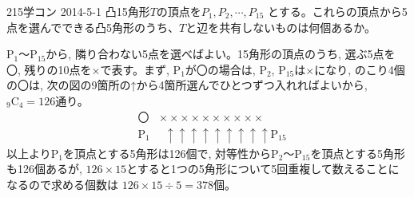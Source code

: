 \begin{thm}{215}{}{学コン 2014-5-1}
 凸15角形$T$の頂点を$P_1, P_2, \cdots, P_{15}$ とする。これらの頂点から5点を選んでできる凸5角形のうち、$T$と辺を共有しないものは何個あるか。
\end{thm}

P$_1$～P$_{15}$から, 隣り合わない5点を選べばよい。15角形の頂点のうち, 選ぶ5点を〇, 残りの10点を×で表す。まず, P$_1$が〇の場合は, P$_2$, P$_15$は×になり, のこり4個の〇は, 次の図の9箇所の↑から4箇所選んでひとつずつ入れればよいから, ${}_9 \mbox{C}_4=126$通り。
\begin{eqnarray*}
&〇&　×　×　×　×　×　×　×　×　×　×\\
&\mbox{P}_1&　\,\,\,↑　\!↑　\!\!↑　\!\!↑　\!\!↑　\!↑　\!\!↑　\!\!↑　\!↑\mbox{P}_{15}
\end{eqnarray*}
以上よりP$_1$を頂点とする5角形は126個で, 対等性からP$_2$～P$_{15}$を頂点とする5角形も126個あるが, $126\times 15$とすると1つの5角形について5回重複して数えることになるので求める個数は $126\times 15\div 5= 378$個。